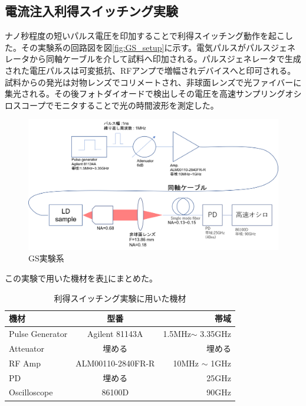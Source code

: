 \subsection{電流注入利得スイッチング実験}%
ナノ秒程度の短いパルス電圧を印加することで利得スイッチング動作を起こした。その実験系の回路図を図\ref{fig:GS_setup}に示す。電気パルスがパルスジェネレータから同軸ケーブルを介して試料へ印加される。パルスジェネレータで生成された電圧パルスは可変抵抗、RFアンプで増幅されデバイスへと印可される。試料からの発光は対物レンズでコリメートされ、非球面レンズで光ファイバーに集光される。その後フォトダイオードで検出しその電圧を高速サンプリングオシロスコープでモニタすることで光の時間波形を測定した。
\begin{figure}[htbp]
	\includegraphics[width=15cm]{figure/fig_2_2_GS_setup.png}
	\caption{GS実験系}
	\label{fig:fig_2_3_GS_setup}
\end{figure}
この実験で用いた機材を表\ref{table:table_2_2_GS_setup}にまとめた。
\begin{table}[hbtp]
  \caption{利得スイッチング実験に用いた機材}
  \label{table:table_2_2_GS_setup}
  \centering
  \begin{tabular}{lcr}
    \hline
    機材  & 型番   & 帯域  \\
    \hline \hline
    Pulse Generator  & Agilent 81143A & 1.5MHz$\sim$ 3.35GHz   \\
    Atteuator  &  埋める    & 埋める\\
    RF Amp & ALM00110-2840FR-R & 10MHz $\sim$ 1GHz \\
    PD & 埋める　& 25GHz \\
    Oscilloscope  &  86100D & 90GHz  \\
       \hline
  \end{tabular}
\end{table}
